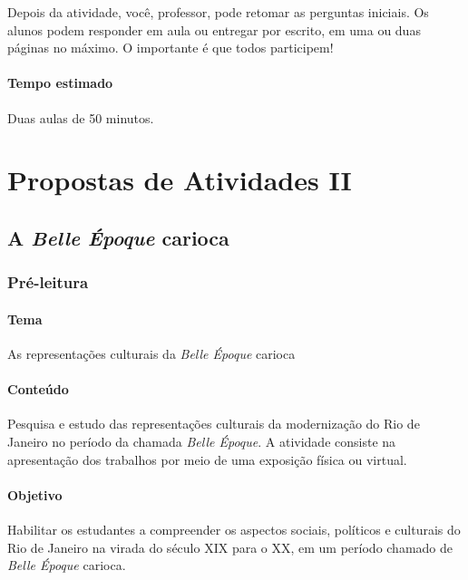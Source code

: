 \documentclass[12pt]{extarticle}
\begin{document}
Depois da atividade, você, professor, pode retomar as perguntas
iniciais. Os alunos podem responder em aula ou entregar por escrito, em
uma ou duas páginas no máximo. O importante é que todos participem!

\paragraph{Tempo estimado} Duas aulas de 50 minutos.



\section{Propostas de Atividades II}

\subsection{A \emph{Belle Époque} carioca}

\subsubsection{Pré-leitura}


\paragraph{Tema} As representações culturais da \emph{Belle Époque} carioca

\paragraph{Conteúdo} Pesquisa e estudo das representações culturais da
modernização do Rio de Janeiro no período da chamada \emph{Belle
Époque}. A atividade consiste na apresentação dos trabalhos por meio de
uma exposição física ou virtual.

\paragraph{Objetivo} Habilitar os estudantes a compreender os aspectos
sociais, políticos e culturais do Rio de Janeiro na virada do século \textsc{XIX}
para o \textsc{XX}, em um período chamado de \emph{Belle Époque} carioca.


\end{document}
